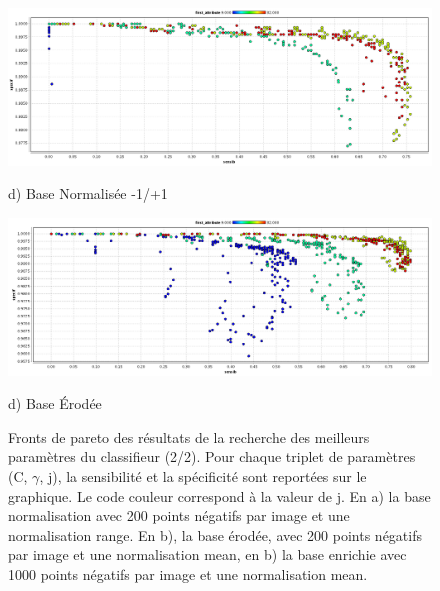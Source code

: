\begin{figure}[h!]
\label{fig:paretoParams2}
\begin{center}

\includegraphics[width=14cm]{images/pareto_param_range.png}

{\small d) Base Normalisée -1/+1}

\vspace{0.5cm}

\includegraphics[width=14cm]{images/pareto_param_erosion.png}

{\small d) Base \'Erodée}


\end{center}
 \caption{Fronts de pareto des résultats de la recherche des meilleurs paramètres du classifieur (2/2). Pour chaque triplet de paramètres (C, $\gamma$, j), la sensibilité et la spécificité sont reportées sur le graphique. Le code couleur correspond à la valeur de j. En a) la base normalisation avec 200 points négatifs par image et une normalisation range. En b), la base érodée, avec 200 points négatifs par image et une normalisation mean, en b) la base enrichie avec 1000 points négatifs par image et une normalisation mean. }
\end{figure}




